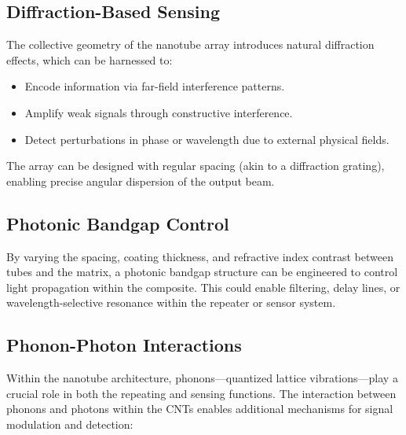 \documentclass[11pt]{article}
\begin{document}
	\subsection{Diffraction-Based Sensing}
	The collective geometry of the nanotube array introduces natural diffraction effects, which can be harnessed to:
	\begin{itemize}
		\item Encode information via far-field interference patterns.
		\item Amplify weak signals through constructive interference.
		\item Detect perturbations in phase or wavelength due to external physical fields.
	\end{itemize}
	The array can be designed with regular spacing (akin to a diffraction grating), enabling precise angular dispersion of the output beam.
	
	\subsection{Photonic Bandgap Control}
	By varying the spacing, coating thickness, and refractive index contrast between tubes and the matrix, a photonic bandgap structure can be engineered to control light propagation within the composite. This could enable filtering, delay lines, or wavelength-selective resonance within the repeater or sensor system.
	
	\subsection{Phonon-Photon Interactions}
	Within the nanotube architecture, phonons—quantized lattice vibrations—play a crucial role in both the repeating and sensing functions. The interaction between phonons and photons within the CNTs enables additional mechanisms for signal modulation and detection:
	
\end{document}
